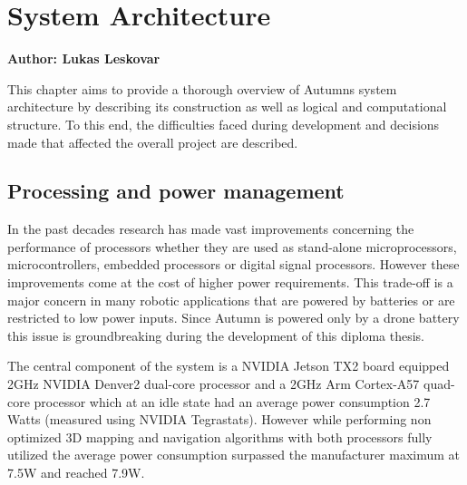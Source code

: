 \chapter{System Architecture}

\textbf{Author: Lukas Leskovar} 

This chapter aims to provide a thorough overview of Autumns system architecture by describing its construction as well as logical and computational  structure. To this end, the difficulties faced during development and decisions made that affected the overall project are described.


\section{Processing and power management}


In the past decades research has made vast improvements concerning the performance of processors whether they are used as stand-alone microprocessors, microcontrollers, embedded processors or digital signal processors. However these improvements come at the cost of higher power requirements. This trade-off is a major concern in many robotic applications that are powered by batteries or are restricted to low power inputs. Since Autumn is powered only by a drone battery this issue is groundbreaking during the development of this diploma thesis. 

The central component of the system is a NVIDIA Jetson TX2 board equipped 2GHz NVIDIA Denver2 dual-core processor and a 2GHz Arm Cortex-A57 quad-core processor which at an idle state had an average power consumption 2.7 Watts (measured using NVIDIA Tegrastats). However while performing non optimized 3D mapping and navigation algorithms with both processors fully utilized the average power consumption surpassed the manufacturer maximum at 7.5W and reached 7.9W. %

